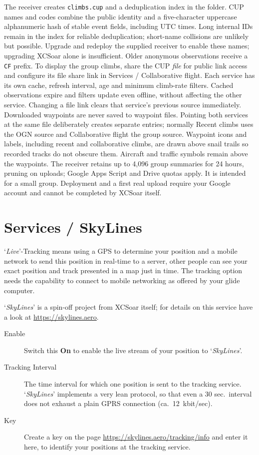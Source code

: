 The receiver creates \texttt{climbs.cup} and a deduplication index in the
folder. CUP names and codes combine the public identity and a five-character
uppercase alphanumeric hash of stable event fields, including UTC times.
Long internal IDs remain in the index for reliable deduplication; short-name
collisions are unlikely but possible. Upgrade and redeploy the supplied
receiver to enable these names; upgrading XCSoar alone is insufficient.
Older anonymous observations receive a \texttt{CF} prefix.
To display the group climbs, share the CUP \emph{file} for public
link access and configure its file share link in Services / Collaborative flight.
Each service has its own cache, refresh interval, age and minimum climb-rate
filters. Cached observations expire and filters update even offline, without
affecting the other service. Changing a file link clears that service's previous
source immediately. Downloaded waypoints are never saved to waypoint files.
Pointing both services at the same file deliberately creates separate entries;
normally Recent climbs uses the OGN source and Collaborative flight the group
source.
Waypoint icons and labels, including recent and collaborative climbs, are
drawn above snail trails so recorded tracks do not obscure them. Aircraft
and traffic symbols remain above the waypoints.
The receiver retains up to 4,096 group summaries for 24 hours, pruning on
uploads; Google Apps Script and Drive quotas apply. It is intended for a
small group. Deployment and a first real upload require your Google
account and cannot be completed by XCSoar itself.


\section{Services / SkyLines}

`{\it Live}'-Tracking means using a GPS to determine your position and a mobile 
network to send this position in real-time to a server, other people can see 
your exact position and track presented in a map just in time.
The tracking option needs the capability to connect to mobile networking as offered by 
your glide computer.

`{\em SkyLines}' is a spin-off project from XCSoar itself; for details on this
service have a look at \url{https://skylines.aero}.

\begin{description}
\item[Enable]  Switch this {\bf On} to enable the live stream of 
  your position to `{\em SkyLines}'.
\item[Tracking Interval]  The time interval for which one position is sent to
  the tracking service. `{\em SkyLines}' implements a very lean protocol, so that even
  a 30 sec.\ interval does not exhaust a plain GPRS connection (ca.\ 12~kbit/sec).
\item[Key]  Create a key on the page \url{https://skylines.aero/tracking/info} 
  and enter it here, to identify your positions at the tracking service.
\end{description}


